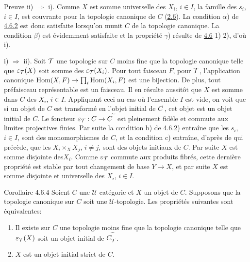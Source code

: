 \documentclass[10pt]{../fichiers-configuration-latex/smfart}
\begin{document}
\begin{enonce*}[remark]{Preuve}
ii) $\Rightarrow$ i). Comme $X$ est somme universelle des $X_i$,
$i\in I$, la famille des $s_i$, $i\in I$, est couvrante pour la
topologie canonique de $C$ (\hyperref[II.prop2.6]{2.6}). La condition
$\alpha$) de \hyperref[II.cor4.6.2]{4.6.2} est donc satisfaite lorsqu'on munit
$C$ de la topologie canonique. La condition $\beta$) est
évidemment satisfaite et la propriété $\gamma$) résulte de
\hyperref[II.prop4.6]{4.6} 1) 2), d'où i).

\noindent i) $\Rightarrow$ ii). Soit ${\mathcal T}$ une topologie sur $C$
moins fine que la topologie canonique telle que $\varepsilon_{{\mathcal T}}(X)$
soit somme des $\varepsilon_{{\mathcal T}}(X_i)$. Pour tout faisceau $F$, pour
${\mathcal T}$, l'application canonique $\operatorname{Hom}(X,F)\rightarrow
\prod_i\operatorname{Hom}(X_i,F)$ est une bijection. De plus, tout préfaisceau
représentable est un faisceau. Il en résulte aussitôt que $X$ est
somme dans $C$ des $X_i$, $i\in I$. Appliquant ceci au cas où
l'ensemble $I$ est vide, on voit que si un objet de $C$ est
transformé en l'objet initial de $C^{\widetilde{\phantom{,}}}$, cet
objet est un objet initial de $C$. Le foncteur
$\varepsilon_{{\mathcal T}}:C\rightarrow C^{\widetilde{\phantom{,}}}$ est
pleinement fidèle et commute aux limites projectives finies. Par
suite la condition b) de \hyperref[II.cor4.6.2]{4.6.2}) entraîne que les $s_i$,
$i\in I$, sont des monomorphismes de $C$, et la condition c)
entraîne, d'après de qui précède, que les $X_i\times_X X_j$, $i\neq
j$, sont des objets initiaux de $C$. Par suite $X$ est somme
disjointe des\pageoriginale $X_i$. Comme $\varepsilon_{{\mathcal T}}$ commute
aux produits fibrés, cette dernière propriété est stable par tout
changement de base $Y\rightarrow X$, et par suite $X$ est somme
disjointe et universelle des $X_i$, $i\in I$.
\end{enonce*}

\begin{enonce*}{Corollaire 4.6.4}
Soient $C$ une $𝒰$-catégorie et $X$ un objet de $C$.
Supposons que la topologie canonique sur $C$ soit une
$𝒰$-topologie. Les propriétés suivantes sont
équivalentes:
\begin{enumerate}
\renewcommand{\theenumi}{\roman{enumi}}
\renewcommand{\labelenumi}{\theenumi)}
\item Il existe sur $C$ une topologie moins fine que la topologie
  canonique telle que $\varepsilon_{{\mathcal T}}(X)$ soit un objet
  initial de $C^{\widetilde{\phantom{,}}}_{{\mathcal T}}$.

\item $X$ est un objet initial strict de $C$.
\end{enumerate}
\end{enonce*}
\end{document}
